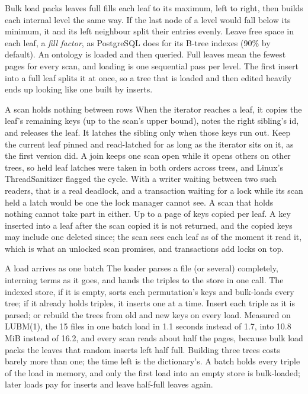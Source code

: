 \begin{decision}{Bulk load packs leaves full}
  fills each leaf to its maximum, left to right,
then builds each internal level the same way. If the last node of a level would
fall below its minimum, it and its left neighbour split their entries evenly.
 Leave free space in each leaf, a \emph{fill factor}, as
PostgreSQL does for its B-tree indexes (90\% by default).
 An ontology is loaded and then queried. Full leaves mean the fewest
pages for every scan, and loading is one sequential pass per level.
 The first insert into a full leaf splits it at once, so a tree that
is loaded and then edited heavily ends up looking like one built by inserts.
\end{decision}

\begin{decision}{A scan holds nothing between rows}
 When the iterator reaches a leaf, it copies the leaf's remaining
keys (up to the scan's upper bound), notes the right sibling's id, and releases
the leaf. It latches the sibling only when those keys run out.
 Keep the current leaf pinned and read-latched for as long
as the iterator sits on it, as the first version did.
 A join keeps one scan open while it opens others on other trees,
so held leaf latches were taken in both orders across trees, and Linux's
ThreadSanitizer flagged the cycle. With a writer waiting between two such
readers, that is a real deadlock, and a transaction waiting for a lock while
its scan held a latch would be one the lock manager cannot see. A scan that
holds nothing cannot take part in either.
 Up to a page of keys copied per leaf. A key inserted into a leaf
after the scan copied it is not returned, and the copied keys may include one
deleted since; the scan sees each leaf as of the moment it read it, which is
what an unlocked scan promises, and transactions add locks on top.
\end{decision}

\begin{decision}{A load arrives as one batch}
 The loader parses a file (or several) completely, interning
terms as it goes, and hands the triples to the store in one call. The indexed
store, if it is empty, sorts each permutation's keys and bulk-loads every tree;
if it already holds triples, it inserts one at a time.
 Insert each triple as it is parsed; or rebuild the trees
from old and new keys on every load.
 Measured on LUBM(1), the 15 files in one batch load in 1.1 seconds
instead of 1.7, into 10.8 MiB instead of 16.2, and every scan reads about half
the pages, because bulk load packs the leaves that random inserts left half
full. Building three trees costs barely more than one; the time left is the
dictionary's.
 A batch holds every triple of the load in memory, and only the
first load into an empty store is bulk-loaded; later loads pay for inserts and
leave half-full leaves again.
\end{decision}

